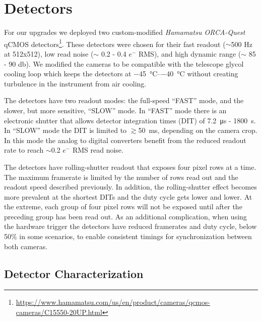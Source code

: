 \section{Detectors}\label{sec:detectors}

For our upgrades we deployed two custom-modified \textit{Hamamatsu ORCA-Quest} qCMOS detectors\footnote{\url{https://www.hamamatsu.com/us/en/product/cameras/qcmos-cameras/C15550-20UP.html}}. These detectors were chosen for their fast readout ($\sim$500 Hz at 512x512), low read noise ($\sim$ 0.2 - 0.4 $e^-$ RMS), and high dynamic range ($\sim$ 85 - 90 \si{\decibel}). We modified the cameras to be compatible with the telescope glycol cooling loop which keeps the detectors at \SIrange{-45}{-40}{\celsius} without creating turbulence in the instrument from air cooling.

The detectors have two  readout modes: the full-speed ``FAST'' mode, and the slower, but more sensitive, ``SLOW'' mode. In ``FAST'' mode there is an electronic shutter that allows detector integration times (DIT) of \SI{7.2}{\micro\second} - \SI{1800}{\second}. In ``SLOW'' mode the DIT is limited to $\gtrsim$\SI{50}{\milli\second}, depending on the camera crop. In this mode the analog to digital converters benefit from the reduced readout rate to reach $\sim$0.2 $e^-$ RMS read noise.

The detectors have rolling-shutter readout that exposes four pixel rows at a time. The maximum framerate is limited by the number of rows read out and the readout speed described previously. In addition, the rolling-shutter effect becomes more prevalent at the shortest DITs and the duty cycle gets lower and lower. At the extreme, each group of four pixel rows will not be exposed until after the preceding group has been read out. As an additional complication, when using the hardware trigger the detectors have reduced framerates and duty cycle, below 50\% in some scenarios, to enable consistent timings for synchronization between both cameras.

\subsection{Detector Characterization}

